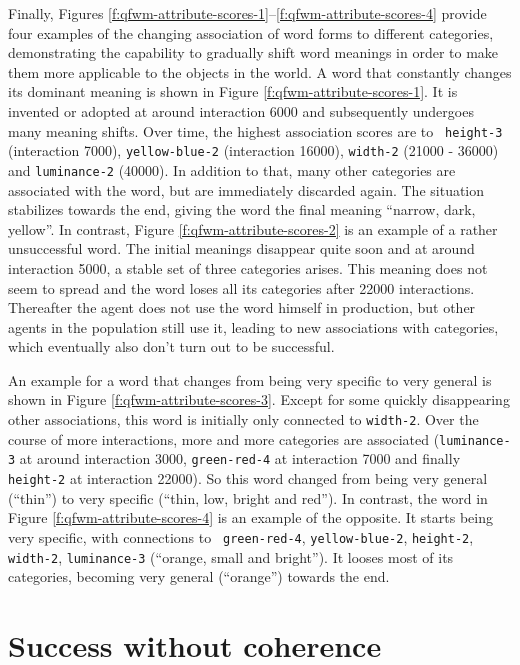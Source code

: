 Finally, Figures
\ref{f:qfwm-attribute-scores-1}--\ref{f:qfwm-attribute-scores-4}
provide four examples of the changing association of word forms to
different categories, demonstrating the capability to gradually shift
word meanings in order to make them more applicable to the objects in
the world. A word that constantly changes its dominant meaning is
shown in Figure
\ref{f:qfwm-attribute-scores-1}. It is invented
or adopted at around interaction 6000 and subsequently undergoes many
meaning shifts.  Over time, the highest association scores are to {\tt
  height-3} (interaction 7000), {\tt yellow-blue-2} (interaction
16000), {\tt width-2} (21000 - 36000) and {\tt luminance-2} (40000).
In addition to that, many other categories are associated with the
word, but are immediately discarded again. The situation stabilizes
towards the end, giving the word the final meaning ``narrow, dark,
yellow''.  In contrast, Figure
\ref{f:qfwm-attribute-scores-2} is an example of
a rather unsuccessful word. The initial meanings disappear quite soon
and at around interaction 5000, a stable set of three categories
arises. This meaning does not seem to spread and the word loses all
its categories after 22000 interactions.  Thereafter the agent does
not use the word himself in production, but other agents in the
population still use it, leading to new associations with categories,
which eventually also don't turn out to be successful.

An example for a word that changes from being very specific to very
general is shown in Figure
\ref{f:qfwm-attribute-scores-3}. Except for some
quickly disappearing other associations, this word is initially only
connected to {\tt width-2}.  Over the course of more interactions,
more and more categories are associated ({\tt luminance-3} at around
interaction 3000, {\tt green-red-4} at interaction 7000 and finally
{\tt height-2} at interaction 22000).  So this word changed from being
very general (``thin'') to very specific (``thin, low, bright and
red''). In contrast, the word in Figure
\ref{f:qfwm-attribute-scores-4} is an example of
the opposite. It starts being very specific, with connections to {\tt
  green-red-4}, {\tt yellow-blue-2}, {\tt height-2}, {\tt width-2},
{\tt luminance-3} (``orange, small and bright'').  It looses most of
its categories, becoming very general (``orange'') towards the end.



\section{Success without coherence}


